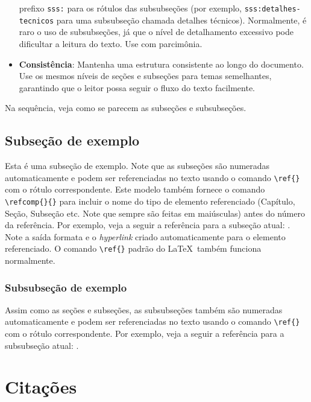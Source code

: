 \begin{itemize}
          prefixo \texttt{sss:} para
          os rótulos das subsubseções (por exemplo, \texttt{sss:detalhes-tecnicos} para uma subsubseção
          chamada detalhes técnicos). Normalmente, é raro o uso de subsubseções, já que o nível de detalhamento
          excessivo pode dificultar a leitura do texto. Use com parcimônia.
    \item \textbf{Consistência}: Mantenha uma estrutura consistente ao longo do documento. Use os mesmos
          níveis de seções e subseções para temas semelhantes, garantindo que o leitor possa seguir o fluxo
          do texto facilmente.
\end{itemize}

Na sequência, veja como se parecem as subseções e subsubseções.

\subsection{Subseção de exemplo}\label{ssc:exemplo}

Esta é uma subseção de exemplo. Note que as subseções são numeradas automaticamente e podem ser
referenciadas no texto usando o comando \verb|\ref{}| com o rótulo correspondente. Este modelo
também fornece o comando \verb|\refcomp{}{}| para incluir o nome do tipo de elemento referenciado
(Capítulo, Seção, Subseção etc. Note que sempre são feitas em maiúsculas) antes do número da
referência. Por exemplo, veja a seguir a referência para a subseção atual:
. Note a saída formata e o \emph{hyperlink} criado automaticamente
para o elemento referenciado. O comando \verb|\ref{}| padrão do \LaTeX\ também funciona normalmente.

\subsubsection{Subsubseção de exemplo}\label{sss:exemplo}

Assim como as seções e subseções, as subsubseções também são numeradas automaticamente e podem ser
referenciadas no texto usando o comando \verb|\ref{}| com o rótulo correspondente. Por exemplo, veja
a seguir a referência para a subsubseção atual: .

\section{Citações}

